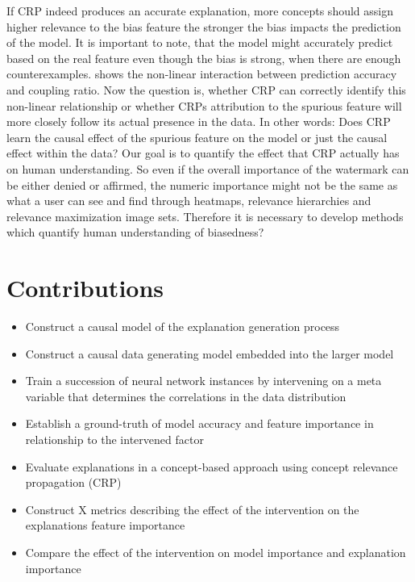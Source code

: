 If CRP indeed produces an accurate explanation, more concepts should assign higher relevance to the bias feature the stronger the bias impacts the prediction of the model. It is important to note, that the model might accurately predict based on the real feature even though the bias is strong, when there are enough counterexamples.  shows the non-linear interaction between prediction accuracy and coupling ratio.
Now the question is, whether CRP can correctly identify this non-linear relationship or whether CRPs attribution to the spurious feature will more closely follow its actual presence in the data. 
In other words: Does CRP learn the causal effect of the spurious feature on the model or just the causal effect within the data? Our goal is to quantify the effect that CRP actually has on human understanding. So even if the overall importance of the watermark can be either denied or affirmed, the numeric importance might not be the same as what a user can see and find through heatmaps, relevance hierarchies and relevance maximization image sets. Therefore it is necessary to develop methods which quantify human understanding of biasedness?  

\section{Contributions}
\begin{itemize}
    \item Construct a causal model of the explanation generation process
    \item Construct a causal data generating model embedded into the larger model
    \item Train a succession of neural network instances by intervening on a meta variable that determines the correlations in the data distribution
    \item Establish a ground-truth of model accuracy and feature importance in relationship to the intervened factor
    \item Evaluate explanations in a concept-based approach using concept relevance propagation (CRP)
    \item Construct X metrics describing the effect of the intervention on the explanations feature importance 
    \item Compare the effect of the intervention on model importance and explanation importance
\end{itemize}

